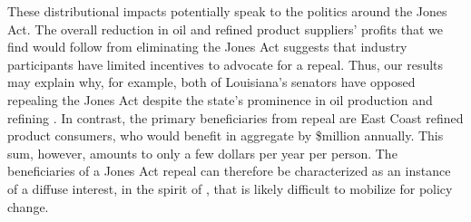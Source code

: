 \documentclass[12pt]{article}
\begin{document}
These distributional impacts potentially speak to the politics around the Jones Act. The overall reduction in oil and refined product suppliers' profits that we find would follow from eliminating the Jones Act suggests that industry participants have limited incentives to advocate for a repeal. Thus, our results may explain why, for example, both of Louisiana's senators have opposed repealing the Jones Act despite the state's prominence in oil production and refining \citep{seafarers2020}. In contrast, the primary beneficiaries from repeal are East Coast refined product consumers, who would benefit in aggregate by \$million annually. This sum, however, amounts to only a few dollars per year per person. The beneficiaries of a Jones Act repeal can therefore be characterized as an instance of a diffuse interest, in the spirit of \cite{Olson}, that is likely difficult to mobilize for policy change.





\end{document}
